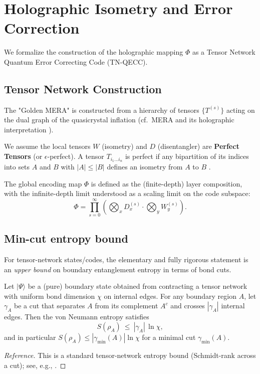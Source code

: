 \section{Holographic Isometry and Error Correction}
\label{app:isometry}

We formalize the construction of the holographic mapping $\Phi$ as a Tensor Network Quantum Error Correcting Code (TN-QECC).

\subsection{Tensor Network Construction}
The "Golden MERA" is constructed from a hierarchy of tensors $\{T^{(s)}\}$ acting on the dual graph of the quasicrystal inflation (cf.\ MERA and its holographic interpretation \cite{Vidal2007MERA,Swingle2012MERA}).
\begin{definition}
We assume the local tensors $W$ (isometry) and $D$ (disentangler) are \textbf{Perfect Tensors} (or $\epsilon$-perfect). A tensor $T_{i_1 \dots i_n}$ is perfect if any bipartition of its indices into sets $A$ and $B$ with $|A| \le |B|$ defines an isometry from $A$ to $B$ \cite{Pastawski2015,Harlow2017}.
\end{definition}
The global encoding map $\Phi$ is defined as the (finite-depth) layer composition, with the infinite-depth limit understood as a scaling limit on the code subspace:
\begin{equation}
    \Phi = \prod_{s=0}^\infty \left( \bigotimes_{x} D^{(s)}_x \cdot \bigotimes_{y} W^{(s)}_y \right).
\end{equation}

\subsection{Min-cut entropy bound}
For tensor-network states/codes, the elementary and fully rigorous statement is an \emph{upper bound} on boundary entanglement entropy in terms of bond cuts.

\begin{theorem}
\label{thm:mincut_entropy}
Let $|\Psi\rangle$ be a (pure) boundary state obtained from contracting a tensor network with uniform bond dimension $\chi$ on internal edges. For any boundary region $A$, let $\gamma_A$ be a cut that separates $A$ from its complement $A^c$ and crosses $|\gamma_A|$ internal edges. Then the von Neumann entropy satisfies
\begin{equation}
    S(\rho_A)\ \le\ |\gamma_A|\,\ln \chi,
\end{equation}
and in particular $S(\rho_A)\le |\gamma_{\min}(A)|\ln\chi$ for a minimal cut $\gamma_{\min}(A)$.
\end{theorem}
\begin{proof}[Reference]
This is a standard tensor-network entropy bound (Schmidt-rank across a cut); see, e.g., \cite{Pastawski2015,Harlow2017}.
\end{proof}


